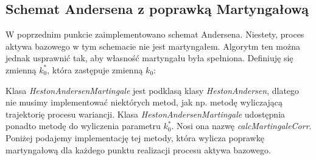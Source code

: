 \documentclass{pracamgr}
\begin{document}





\clearpage
\subsection{Schemat Andersena z poprawką Martyngałową}
W poprzednim punkcie zaimplementowano schemat Andersena. 
Niestety, proces aktywa bazowego w tym schemacie nie jest martyngałem.
Algorytm ten można jednak usprawnić tak, aby własność martyngału była spełniona.
Definiuję się zmienną $k_0^*$, która zastępuje zmienną $k_0$: 

Klasa \textit{HestonAndersenMartingale} jest podklasą klasy \textit{HestonAndersen}, 
dlatego nie musimy implementować niektórych metod, jak np. metodę wyliczającą trajektorię procesu
wariancji. 
Klasa \textit{HestonAndersenMartingale} udostępnia ponadto metodę do wyliczenia parametru $k_0^*$.
Nosi ona nazwę \textit{calcMartingaleCorr}. 
Poniżej podajemy implementację tej metody, która wylicza poprawkę martyngałową 
dla każdego punktu realizacji procesu aktywa bazowego.




\clearpage
\end{document}
